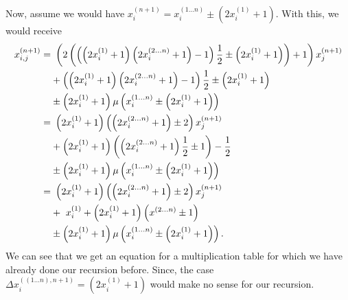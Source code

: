 Now, assume we would have $x_{i}^{\left(n+1\right)} = x_{i}^{\left(1 \dots n\right)} \pm \left(2x_{i}^{\left(1\right)} + 1\right)$. With this, we would receive
\begin{alignat}{3}
	x_{i,j}^{\left(n+1\right)} =& \ \left(2\left(\left(\left(2x_{i}^{\left(1\right)} + 1\right)\left(2x_{i}^{\left(2 \dots n\right)} + 1\right) - 1\right)\frac{1}{2} \pm \left(2x^{\left(1\right)}_{i} + 1\right)\right) + 1\right)x_{j}^{\left(n+1\right)} \notag \\
	&+ \left(\left(2x_{i}^{\left(1\right)} + 1\right)\left(2x_{i}^{\left(2 \dots n\right)} + 1\right) - 1\right)\frac{1}{2} \pm \left(2x_{i}^{\left(1\right)} + 1\right)\notag \\
	&\pm \left(2x_{i}^{\left(1\right)} + 1\right)\mu\left(x_{i}^{\left(1 \dots n\right)} \pm \left(2x_{i}^{\left(1\right)} + 1\right)\right) \notag \\
	=& \ \left(2x_{i}^{\left(1\right)} + 1\right)\left(\left(2x_{i}^{\left(2 \dots n\right)} + 1\right) \pm 2\right)x_{j}^{\left(n+1\right)} \notag \\
	&+ \left(2x_{i}^{\left(1\right)} + 1\right)\left(\left(2x_{i}^{\left(2 \dots n\right)} + 1\right)\frac{1}{2} \pm 1\right) - \frac{1}{2} \notag \\
	&\pm \left(2x_{i}^{\left(1\right)} + 1\right)\mu\left(x_{i}^{\left(1 \dots n\right)} \pm \left(2x_{i}^{\left(1\right)} + 1\right)\right) \notag \\
	=& \ \left(2x_{i}^{\left(1\right)} + 1\right)\left(\left(2x_{i}^{\left(2 \dots n\right)} + 1\right) \pm 2\right)x_{j}^{\left(n+1\right)} \notag \\
	&+ \ x_{i}^{\left(1\right)} + \left(2x_{i}^{\left(1\right)} + 1\right)\left(x^{\left(2 \dots n\right)} \pm 1\right) \notag \\ 
	&\pm \left(2x_{i}^{\left(1\right)} + 1\right)\mu\left(x_{i}^{\left(1 \dots n\right)} \pm \left(2x_{i}^{\left(1\right)} + 1\right)\right). \label{eq:deltafactorsense2}
\end{alignat}
We can see that we get an equation for a multiplication table for which we have already done our recursion before. Since, the case $\Delta x_{i}^{\left(\left(1 \dots n\right),n + 1\right)} = \left(2x_{i}^{\left(1\right)} + 1\right)$ would make no sense for our recursion.
